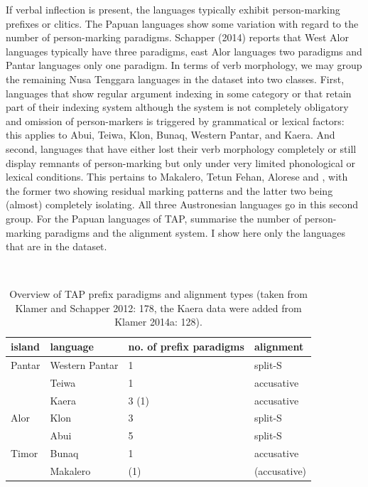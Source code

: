 If verbal inflection is present, the languages typically exhibit person-marking prefixes or clitics. The Papuan languages show some variation with regard to the number of person-marking paradigms. Schapper (2014) reports that West Alor languages typically have three paradigms, east Alor languages two paradigms and Pantar languages only one paradigm. In terms of verb morphology, we may group the remaining Nusa Tenggara languages in the dataset into two classes. First,  languages that show regular argument indexing in some category or that retain part of their indexing system although the system is not completely obligatory and omission of person-markers is triggered by grammatical or lexical factors: this applies to Abui, Teiwa, Klon, Bunaq, Western Pantar, and Kaera. And second, languages that have either lost their verb morphology completely or still display remnants of person-marking but only under very limited phonological or lexical conditions. This pertains to Makalero, Tetun Fehan, Alorese and , with the former two showing residual marking patterns and the latter two being (almost) completely isolating. All three Austronesian languages go in this second group. For the Papuan languages of TAP, \textcite{klamer2012development} summarise the number of person-marking paradigms and the alignment system. I show here only the languages that are in the dataset.

\
\begin{table}

\begin{footnotesize}
\begin{tabular}{l l l l}
\hline\hline
island & language & no. of prefix paradigms & alignment \tabularnewline
\hline
Pantar & Western Pantar & 1 & split-S \tabularnewline
 & Teiwa & 1 & accusative \tabularnewline
 & Kaera & 3 (1) & accusative \tabularnewline
 Alor & Klon & 3 & split-S \tabularnewline
 & Abui & 5 & split-S \tabularnewline
 Timor & Bunaq & 1 & accusative \tabularnewline
 & Makalero & (1) & (accusative) \tabularnewline
\hline
\end{tabular}
\caption[Overview of TAP prefix paradigms and alignment types]{Overview of TAP prefix paradigms and alignment types (taken from Klamer and Schapper 2012: 178, the Kaera data were added from Klamer 2014a: 128).}
\label{table:TAPprefixalign}
\end{footnotesize}

\end{table}
\

